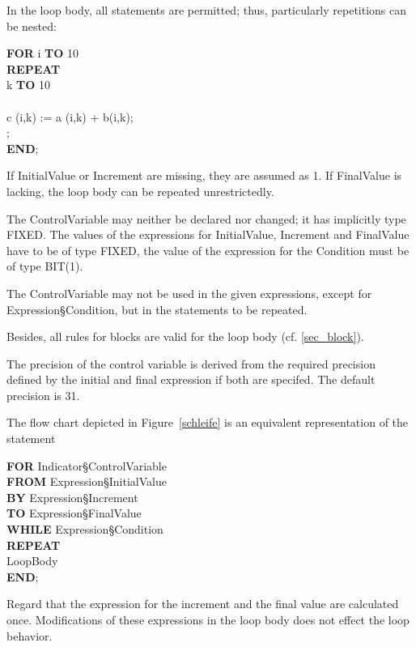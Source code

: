 In the loop body, all statements are permitted; thus, particularly
repetitions can be nested:

{\bf FOR} i {\bf TO} 10\\
{\bf REPEAT} \\
 k {\bf TO} 10 \\
 \\
\x \x c (i,k) := a (i,k) + b(i,k);\\
;\\
{\bf END};

If InitialValue or Increment are missing, they are assumed as 1. If FinalValue is lacking, the loop body can be repeated unrestrictedly.

The ControlVariable may neither be declared nor changed; it has
implicitly type FIXED. The values of the expressions for InitialValue,
Increment and FinalValue have to be of type FIXED, the value of the
expression for the Condition must be of type BIT(1).

The ControlVariable may not be used in the given expressions, except
for Expression\S Condition, but in the statements to be repeated.

Besides, all rules for blocks are valid for the loop body (cf. \ref{sec_block}).

The precision of the control variable is derived from the
required precision defined by the initial and final expression if both are
specifed.
The default precision is 31.

The flow chart depicted in Figure~\ref{schleife} is an equivalent representation of the
statement

{\bf FOR} Indicator\S ControlVariable \\
{\bf FROM} Expression\S InitialValue \\
{\bf BY} Expression\S Increment \\
{\bf TO} Expression\S FinalValue \\
{\bf WHILE} Expression\S Condition \\
{\bf REPEAT} \\
\x LoopBody \\
{\bf END};

Regard that the expression for the increment and the final
value are calculated once. Modifications of these expressions
in the loop body does not effect the loop behavior.

